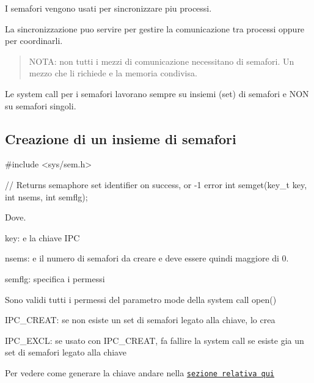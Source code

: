 I semafori vengono usati per sincronizzare piu\textquotesingle{} processi.

La sincronizzazione puo\textquotesingle{} servire per gestire la comunicazione tra processi oppure per coordinarli. \begin{quote}
N\+O\+TA\+: non tutti i mezzi di comunicazione necessitano di semafori. Un mezzo che li richiede e\textquotesingle{} la memoria condivisa. \end{quote}


Le system call per i semafori lavorano sempre su insiemi (set) di semafori e N\+ON su semafori singoli.

\subsection*{Creazione di un insieme di semafori}


\begin{DoxyCode}
\textcolor{preprocessor}{#include <sys/sem.h>}

\textcolor{comment}{// Returns semaphore set identifier on success, or -1 error}
\textcolor{keywordtype}{int} semget(key\_t key, \textcolor{keywordtype}{int} nsems, \textcolor{keywordtype}{int} semflg);
\end{DoxyCode}


Dove.
\begin{DoxyItemize}
\item {\ttfamily key}\+: e\textquotesingle{} la chiave I\+PC
\item {\ttfamily nsems}\+: e\textquotesingle{} il numero di semafori da creare e deve essere quindi maggiore di 0.
\item {\ttfamily semflg}\+: specifica i permessi
\begin{DoxyItemize}
\item Sono validi tutti i permessi del parametro {\ttfamily mode} della system call {\ttfamily open()}
\item {\ttfamily I\+P\+C\+\_\+\+C\+R\+E\+AT}\+: se non esiste un set di semafori legato alla chiave, lo crea
\item {\ttfamily I\+P\+C\+\_\+\+E\+X\+CL}\+: se usato con {\ttfamily I\+P\+C\+\_\+\+C\+R\+E\+AT}, fa fallire la system call se esiste gia\textquotesingle{} un set di semafori legato alla chiave
\end{DoxyItemize}
\end{DoxyItemize}

Per vedere come generare la chiave andare nella \href{md_theory_generate_keys_generate_keys.html}{\tt sezione relativa qui}

